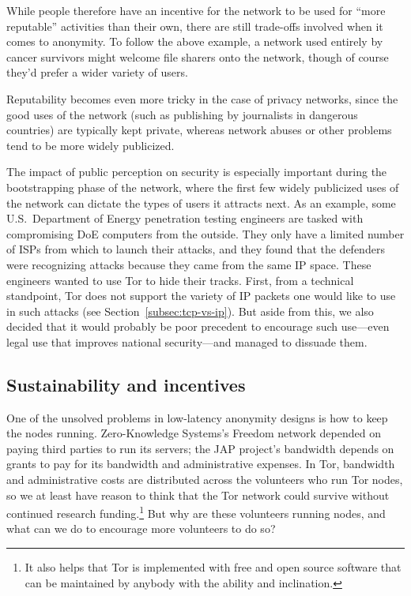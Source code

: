 \documentclass{llncs}
\begin{document}
While people therefore have an incentive for the network to be used for
``more reputable'' activities than their own, there are still trade-offs
involved when it comes to anonymity. To follow the above example, a
network used entirely by cancer survivors might welcome file sharers
onto the network, though of course they'd prefer a wider
variety of users.

Reputability becomes even more tricky in the case of privacy networks,
since the good uses of the network (such as publishing by journalists in
dangerous countries) are typically kept private, whereas network abuses
or other problems tend to be more widely publicized.

The impact of public perception on security is especially important
during the bootstrapping phase of the network, where the first few
widely publicized uses of the network can dictate the types of users it
attracts next.
As an example, some U.S.~Department of Energy
penetration testing engineers are tasked with compromising DoE computers
from the outside. They only have a limited number of ISPs from which to
launch their attacks, and they found that the defenders were recognizing
attacks because they came from the same IP space. These engineers wanted
to use Tor to hide their tracks. First, from a technical standpoint,
Tor does not support the variety of IP packets one would like to use in
such attacks (see Section~\ref{subsec:tcp-vs-ip}). But aside from this,
we also decided that it would probably be poor precedent to encourage
such use---even legal use that improves national security---and managed
to dissuade them.


\subsection{Sustainability and incentives}
One of the unsolved problems in low-latency anonymity designs is
how to keep the nodes running.  Zero-Knowledge Systems's Freedom network
depended on paying third parties to run its servers; the JAP project's
bandwidth depends on grants to pay for its bandwidth and
administrative expenses.  In Tor, bandwidth and administrative costs are
distributed across the volunteers who run Tor nodes, so we at least have
reason to think that the Tor network could survive without continued research
funding.\footnote{It also helps that Tor is implemented with free and open
  source software that can be maintained by anybody with the ability and
  inclination.}  But why are these volunteers running nodes, and what can we
do to encourage more volunteers to do so?
\end{document}
